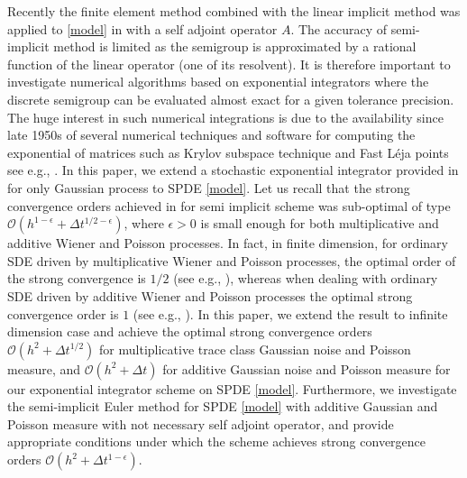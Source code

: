 \documentclass[review,12pt]{elsarticle}
\begin{document}
         Recently the finite element method combined with the linear implicit method was applied to \eqref{model} in \cite{Yang} with  a  self adjoint operator $A$.
         The  accuracy of semi-implicit method is limited as the semigroup is approximated by  a rational function of the linear operator (one  of  its  resolvent).
          It is therefore  important to investigate numerical  algorithms  based on exponential integrators where  the discrete semigroup can be evaluated almost exact  for  a given tolerance precision.
          The  huge interest in such numerical integrations is due to the availability since late 1950s of several numerical techniques and  software  for computing the  exponential of matrices such as Krylov subspace technique and Fast L\'{e}ja points  see e.g.,  \cite{Kry,Leja1,Sidje,Leja2}.  In this paper,  we  extend   a stochastic  exponential integrator  provided in \cite{Antonio1,AntonioRev2}  for only Gaussian  process  to   SPDE \eqref{model}.
           Let us recall that the strong convergence orders achieved in \cite{Yang}  for semi  implicit scheme was sub-optimal  of type $\mathcal{O}\left(h^{1-\epsilon}+\Delta t^{1/2-\epsilon}\right)$, where $\epsilon>0$ is small enough for both  multiplicative and additive Wiener and Poisson processes. 
           In fact,  in finite dimension,  for ordinary SDE  driven by multiplicative Wiener  and Poisson processes, the optimal  order of the strong convergence is $1/2$ (see e.g., \cite{Gan,Kloeden1,Platen1,Bruti1}), 
           whereas when dealing with ordinary SDE driven by additive Wiener and Poisson processes the optimal strong convergence order is $1$ (see e.g., \cite{Platen1,Bruti1}).
           In this paper, we extend the result to infinite dimension case  and achieve  the  optimal  strong convergence orders $\mathcal{O}\left(h^2+\Delta t^{1/2}\right)$ for   multiplicative trace class Gaussian noise and  Poisson measure, and  $\mathcal{O}(h^2+\Delta t)$ for additive Gaussian noise and Poisson measure for  our exponential integrator  scheme on SPDE \eqref{model}.  Furthermore,  we   investigate   the semi-implicit Euler method for SPDE \eqref{model} with additive Gaussian and Poisson measure with not necessary self adjoint operator, and  provide appropriate conditions under which the scheme achieves strong convergence orders $\mathcal{O}\left(h^2+\Delta t^{1-\epsilon}\right)$. 
\end{document}
